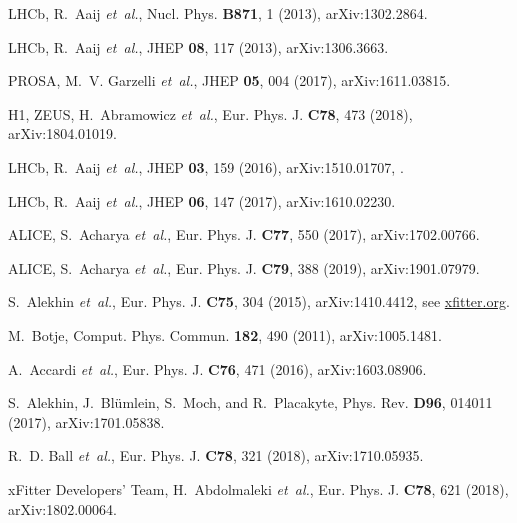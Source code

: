 \documentclass[12pt]{article}
\begin{document}
\begin{thebibliography}{99}
LHCb, R.~Aaij {\em et~al.},
\newblock Nucl. Phys. {\bf B871}, 1 (2013), arXiv:1302.2864.

LHCb, R.~Aaij {\em et~al.},
\newblock JHEP {\bf 08}, 117 (2013), arXiv:1306.3663.

PROSA, M.~V. Garzelli {\em et~al.},
\newblock JHEP {\bf 05}, 004 (2017), arXiv:1611.03815.

H1, ZEUS, H.~Abramowicz {\em et~al.},
\newblock Eur. Phys. J. {\bf C78}, 473 (2018), arXiv:1804.01019.

LHCb, R.~Aaij {\em et~al.},
\newblock JHEP {\bf 03}, 159 (2016), arXiv:1510.01707,
.

LHCb, R.~Aaij {\em et~al.},
\newblock JHEP {\bf 06}, 147 (2017), arXiv:1610.02230.

ALICE, S.~Acharya {\em et~al.},
\newblock Eur. Phys. J. {\bf C77}, 550 (2017), arXiv:1702.00766.

ALICE, S.~Acharya {\em et~al.},
\newblock Eur. Phys. J. {\bf C79}, 388 (2019), arXiv:1901.07979.

S.~Alekhin {\em et~al.},
\newblock Eur. Phys. J. {\bf C75}, 304 (2015), arXiv:1410.4412,
\newblock see \url{xfitter.org}.

M.~Botje,
\newblock Comput. Phys. Commun. {\bf 182}, 490 (2011), arXiv:1005.1481.

A.~Accardi {\em et~al.},
\newblock Eur. Phys. J. {\bf C76}, 471 (2016), arXiv:1603.08906.

S.~Alekhin, J.~Bl{\"u}mlein, S.~Moch, and R.~Placakyte,
\newblock Phys. Rev. {\bf D96}, 014011 (2017), arXiv:1701.05838.

R.~D. Ball {\em et~al.},
\newblock Eur. Phys. J. {\bf C78}, 321 (2018), arXiv:1710.05935.

xFitter Developers' Team, H.~Abdolmaleki {\em et~al.},
\newblock Eur. Phys. J. {\bf C78}, 621 (2018), arXiv:1802.00064.


\end{thebibliography}
\end{document}
